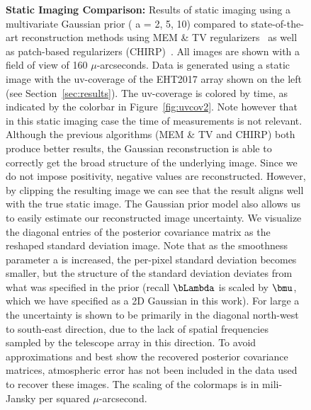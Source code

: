 \begin{figure}[h!]
\begin{center}
		\caption{{\bf Static Imaging Comparison:} Results of static imaging using a multivariate Gaussian prior ( \textsf{a} = 2, 5, 10) compared to state-of-the-art reconstruction methods using MEM \& TV regularizers~\cite{andrew} as well as patch-based regularizers (CHIRP)~\cite{bouman2016computational}. All images are shown with a field of view of 160 $\mu$-arcseconds. Data is generated using a static image with the uv-coverage of the EHT2017 array shown on the left (see Section~\ref{sec:results}). The uv-coverage is colored by time, as indicated by the colorbar in Figure~\ref{fig:uvcov2}. Note however that in this static imaging case the time of measurements is not relevant. Although the previous algorithms (MEM \& TV and CHIRP) both produce better results, the Gaussian reconstruction is able to correctly get the broad structure of the underlying image. Since we do not impose positivity, negative values are reconstructed. However, by clipping the resulting image we can see that the result aligns well with the true static image. The Gaussian prior model also allows us to easily estimate our reconstructed image uncertainty. We visualize the diagonal entries of the posterior covariance matrix as the reshaped standard deviation image. Note that as the smoothness parameter \textsf{a} is increased, the per-pixel standard deviation becomes smaller, but the structure of the standard deviation deviates from what was specified in the prior (recall $\bLambda$ is scaled by $\bmu$, which we have specified as a 2D Gaussian in this work). For large \textsf{a} the uncertainty is shown to be primarily in the diagonal north-west to south-east direction, due to the lack of spatial frequencies sampled by the telescope array in this direction. To avoid approximations and best show the recovered posterior covariance matrices, atmospheric error has not been included in the data used to recover these images. The scaling of the colormaps is in mili-Jansky per squared $\mu$-arcsecond. } 
		\label{fig:staticimaging}
	\end{center}
	\vspace{-.2in}
\end{figure}